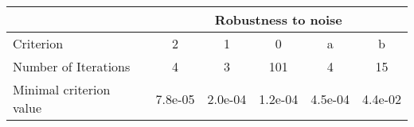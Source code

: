 \begin{tabular}{l|ccccc|}
 & \multicolumn{5}{c}{Robustness to noise} \\
\hline
Criterion & 2 & 1 & 0 & a & b \\
Number of Iterations & 4 & 3 & 101 & 4 & 15 \\
Minimal criterion value & 7.8e-05 & 2.0e-04 & 1.2e-04 & 4.5e-04 & 4.4e-02 \\
\hline
\end{tabular}
